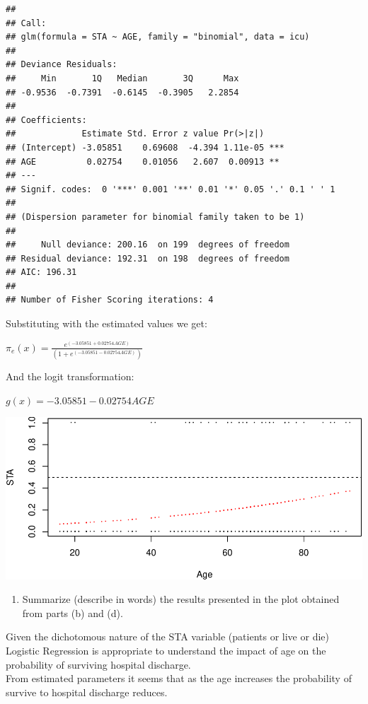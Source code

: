 \documentclass[]{article}
\begin{document}
\begin{verbatim}
## 
## Call:
## glm(formula = STA ~ AGE, family = "binomial", data = icu)
## 
## Deviance Residuals: 
##     Min       1Q   Median       3Q      Max  
## -0.9536  -0.7391  -0.6145  -0.3905   2.2854  
## 
## Coefficients:
##             Estimate Std. Error z value Pr(>|z|)    
## (Intercept) -3.05851    0.69608  -4.394 1.11e-05 ***
## AGE          0.02754    0.01056   2.607  0.00913 ** 
## ---
## Signif. codes:  0 '***' 0.001 '**' 0.01 '*' 0.05 '.' 0.1 ' ' 1
## 
## (Dispersion parameter for binomial family taken to be 1)
## 
##     Null deviance: 200.16  on 199  degrees of freedom
## Residual deviance: 192.31  on 198  degrees of freedom
## AIC: 196.31
## 
## Number of Fisher Scoring iterations: 4
\end{verbatim}

Substituting with the estimated values we get:

$\pi_{e}(x)=\frac{e^{(-3.05851+0.02754AGE)}}{(1+e^{(-3.05851-0.02754AGE)})}$

And the logit transformation:

$g(x)=-3.05851-0.02754AGE$

\begin{center}\includegraphics{HomeworkWeek1_files/figure-latex/unnamed-chunk-6-1} \end{center}

\begin{enumerate}
\def\labelenumi{\alph{enumi}.}
\setcounter{enumi}{4}
\itemsep1pt\parskip0pt
\item
  Summarize (describe in words) the results presented in the plot
  obtained from parts (b) and (d).
\end{enumerate}

Given the dichotomous nature of the STA variable (patients or live or
die) Logistic Regression is appropriate to understand the impact of age
on the probability of surviving hospital discharge.\\From estimated
parameters it seems that as the age increases the probability of survive
to hospital discharge reduces.
\end{document}
